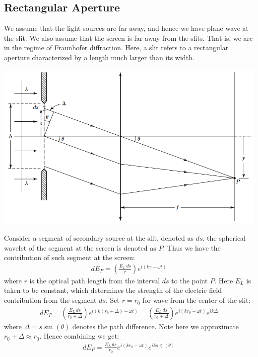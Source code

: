 \documentclass[11pt]{book}
\theoremstyle{break}
\theoremstyle{break}
\begin{document}
\subsection{Rectangular Aperture}
We assume that the light sources are far away, and hence we have plane wave at the slit. We also assume that the screen is far away from the slits. That is, we are in the regime of Fraunhofer diffraction. Here, a slit refers to a rectangular aperture characterized by a length much larger than its width. \\
\begin{center}
\includegraphics[scale=0.8]{SingleSlit}
\end{center}
Consider a segment of secondary source at the slit, denoted as $ds$. the spherical wavelet of the segment at the screen is denoted as $P$. Thus we have the contribution of such segment at the screen:
\begin{align}
dE_P = \left( \frac{E_L \, ds}{r}\right)e^{i(kr-\omega t)}
\end{align}
where $r$ is the optical path length from the interval $ds$ to the point $P$. Here $E_L$ is taken to be constant, which determines the strength of the electric field contribution from the segment $ds$. Set $r = r_0$ for wave from the center of the slit:
\begin{align*}
dE_P = \left( \frac{E_L\, ds}{r_0 + \Delta }\right) e^{i(k(r_0 +\Delta) -\omega t)} = \left( \frac{E_L\, ds}{r_0 +\Delta}\right) e^{i(kr_0 -\omega t)}e^{ik \Delta}
\end{align*}
where $\Delta = s\sin(\theta)$ denotes the path difference. Note here we approximate $r_0 + \Delta \approx r_0$. Hence combining we get:
\begin{align*}
dE_P = \frac{E_L\, ds}{r_0} e^{i(kr_0 -\omega t)}e^{iks\in(\theta)}
\end{align*}
\end{document}
